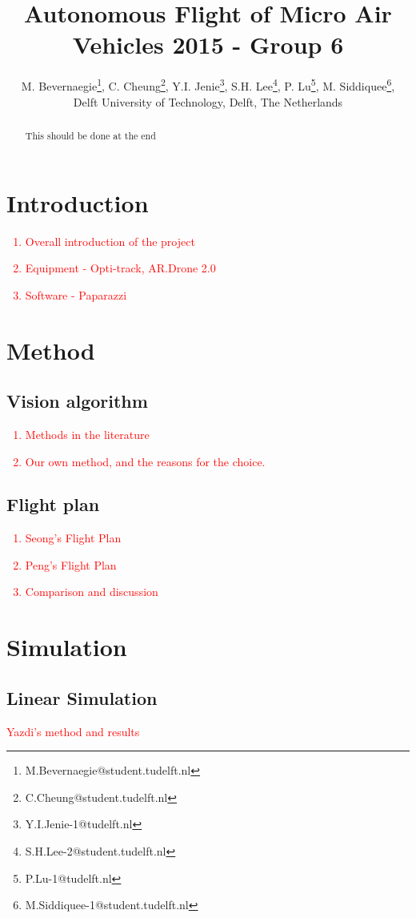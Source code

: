 \documentclass{article}
\title{Autonomous Flight of Micro Air Vehicles 2015 - Group 6}
\author{M. Bevernaegie\thanks{M.Bevernaegie@student.tudelft.nl}, C. Cheung\thanks{C.Cheung@student.tudelft.nl}, Y.I. Jenie\thanks{Y.I.Jenie-1@tudelft.nl}, S.H. Lee\thanks{S.H.Lee-2@student.tudelft.nl}, P. Lu\thanks{P.Lu-1@tudelft.nl}, M. Siddiquee\thanks{M.Siddiquee-1@student.tudelft.nl}, \\ Delft University of Technology, Delft, The Netherlands}
\begin{document}
\maketitle

\begin{abstract}
{\color{red} This should be done at the end}


\end{abstract}

\section{Introduction} \label{section:introduction}
\textcolor{red}{ 
\begin{enumerate}
	\item Overall introduction of the project
	\item Equipment - Opti-track, AR.Drone 2.0
	\item Software - Paparazzi
\end{enumerate}
}

\section{Method}
\subsection{Vision algorithm}
\textcolor{red}{ 
\begin{enumerate}
	\item Methods in the literature
	\item Our own method, and the reasons for the choice.
\end{enumerate}
}
\subsection{Flight plan}
\textcolor{red}{ 
	\begin{enumerate}
		\item Seong's Flight Plan
		\item Peng's Flight Plan
		\item Comparison and discussion
	\end{enumerate}
}

\section{Simulation}
\subsection{Linear Simulation}
\textcolor{red}{ Yazdi's method and results}
\end{document}
